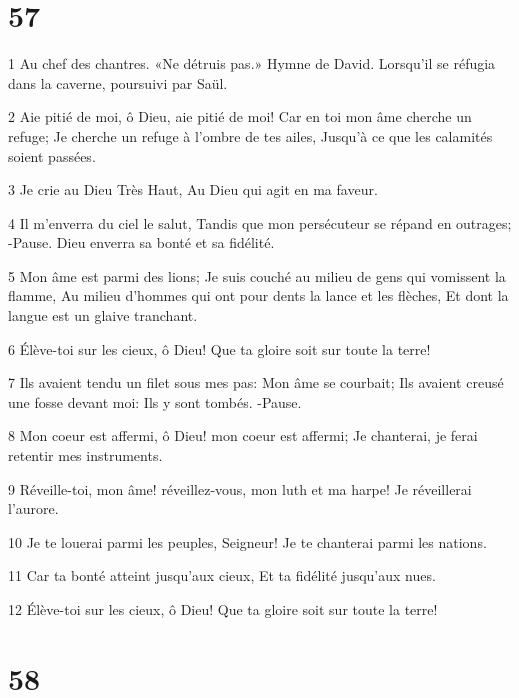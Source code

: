 \chapter{57}

\par 1 Au chef des chantres. «Ne détruis pas.» Hymne de David. Lorsqu'il se réfugia dans la caverne, poursuivi par Saül.
\par 2 Aie pitié de moi, ô Dieu, aie pitié de moi! Car en toi mon âme cherche un refuge; Je cherche un refuge à l'ombre de tes ailes, Jusqu'à ce que les calamités soient passées.
\par 3 Je crie au Dieu Très Haut, Au Dieu qui agit en ma faveur.
\par 4 Il m'enverra du ciel le salut, Tandis que mon persécuteur se répand en outrages; -Pause. Dieu enverra sa bonté et sa fidélité.
\par 5 Mon âme est parmi des lions; Je suis couché au milieu de gens qui vomissent la flamme, Au milieu d'hommes qui ont pour dents la lance et les flèches, Et dont la langue est un glaive tranchant.
\par 6 Élève-toi sur les cieux, ô Dieu! Que ta gloire soit sur toute la terre!
\par 7 Ils avaient tendu un filet sous mes pas: Mon âme se courbait; Ils avaient creusé une fosse devant moi: Ils y sont tombés. -Pause.
\par 8 Mon coeur est affermi, ô Dieu! mon coeur est affermi; Je chanterai, je ferai retentir mes instruments.
\par 9 Réveille-toi, mon âme! réveillez-vous, mon luth et ma harpe! Je réveillerai l'aurore.
\par 10 Je te louerai parmi les peuples, Seigneur! Je te chanterai parmi les nations.
\par 11 Car ta bonté atteint jusqu'aux cieux, Et ta fidélité jusqu'aux nues.
\par 12 Élève-toi sur les cieux, ô Dieu! Que ta gloire soit sur toute la terre!

\chapter{58}

